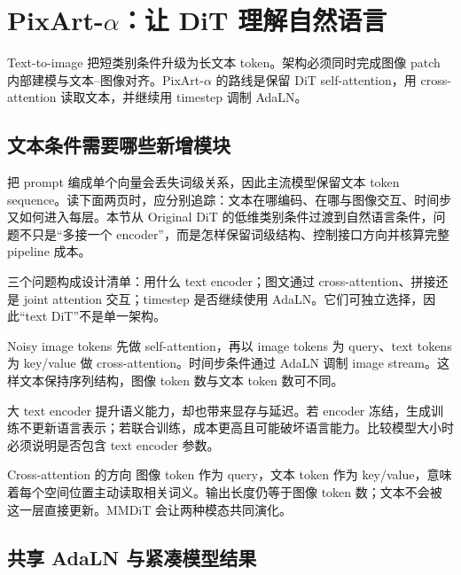 \section{PixArt-$\alpha$：让 DiT 理解自然语言}

Text-to-image 把短类别条件升级为长文本 token。架构必须同时完成图像 patch 内部建模与文本--图像对齐。PixArt-$\alpha$ 的路线是保留 DiT self-attention，用 cross-attention 读取文本，并继续用 timestep 调制 AdaLN。

\subsection{文本条件需要哪些新增模块}

把 prompt 编成单个向量会丢失词级关系，因此主流模型保留文本 token sequence。读下面两页时，应分别追踪：文本在哪编码、在哪与图像交互、时间步又如何进入每层。本节从 Original DiT 的低维类别条件过渡到自然语言条件，问题不只是“多接一个 encoder”，而是怎样保留词级结构、控制接口方向并核算完整 pipeline 成本。


三个问题构成设计清单：用什么 text encoder；图文通过 cross-attention、拼接还是 joint attention 交互；timestep 是否继续使用 AdaLN。它们可独立选择，因此“text DiT”不是单一架构。


Noisy image tokens 先做 self-attention，再以 image tokens 为 query、text tokens 为 key/value 做 cross-attention。时间步条件通过 AdaLN 调制 image stream。这样文本保持序列结构，图像 token 数与文本 token 数可不同。


大 text encoder 提升语义能力，却也带来显存与延迟。若 encoder 冻结，生成训练不更新语言表示；若联合训练，成本更高且可能破坏语言能力。比较模型大小时必须说明是否包含 text encoder 参数。

\begin{knowledgebox}{Cross-attention 的方向}
图像 token 作为 query，文本 token 作为 key/value，意味着每个空间位置主动读取相关词义。输出长度仍等于图像 token 数；文本不会被这一层直接更新。MMDiT 会让两种模态共同演化。
\end{knowledgebox}

\subsection{共享 AdaLN 与紧凑模型结果}

